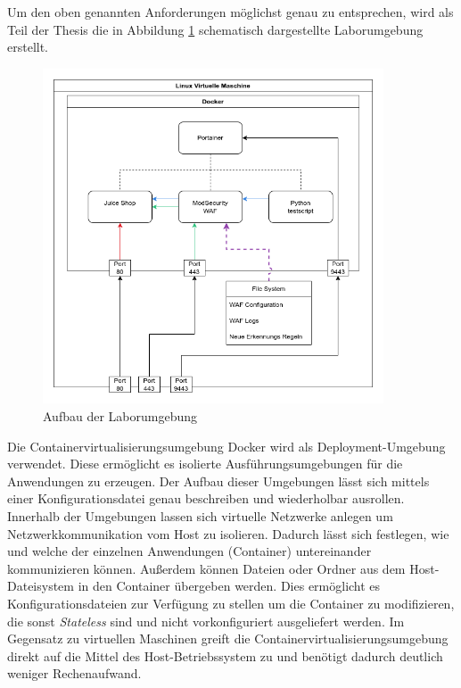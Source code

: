 Um den oben genannten Anforderungen möglichst genau zu entsprechen, wird als Teil der Thesis die in Abbildung \ref{fig:lab} schematisch dargestellte Laborumgebung erstellt.

\begin{figure}[!hbt]
    \centering
    \includegraphics[width=0.9\textwidth]{./images/lab-setup.png}
    \caption{Aufbau der Laborumgebung}
    \label{fig:lab}
\end{figure}

Die Containervirtualisierungsumgebung Docker wird als Deployment-Umgebung verwendet.
Diese ermöglicht es isolierte Ausführungsumgebungen für die Anwendungen zu erzeugen.
Der Aufbau dieser Umgebungen lässt sich mittels einer Konfigurationsdatei genau beschreiben und wiederholbar ausrollen.
Innerhalb der Umgebungen lassen sich virtuelle Netzwerke anlegen um Netzwerkkommunikation vom Host zu isolieren.
Dadurch lässt sich festlegen, wie und welche der einzelnen Anwendungen (Container) untereinander kommunizieren können.
Außerdem können Dateien oder Ordner aus dem Host-Dateisystem in den Container übergeben werden.
Dies ermöglicht es Konfigurationsdateien zur Verfügung zu stellen um die Container zu modifizieren, die sonst \textit{Stateless} sind und nicht vorkonfiguriert ausgeliefert werden.
Im Gegensatz zu virtuellen Maschinen greift die Containervirtualisierungsumgebung direkt auf die Mittel des Host-Betriebssystem zu und benötigt dadurch deutlich weniger Rechenaufwand.\\

